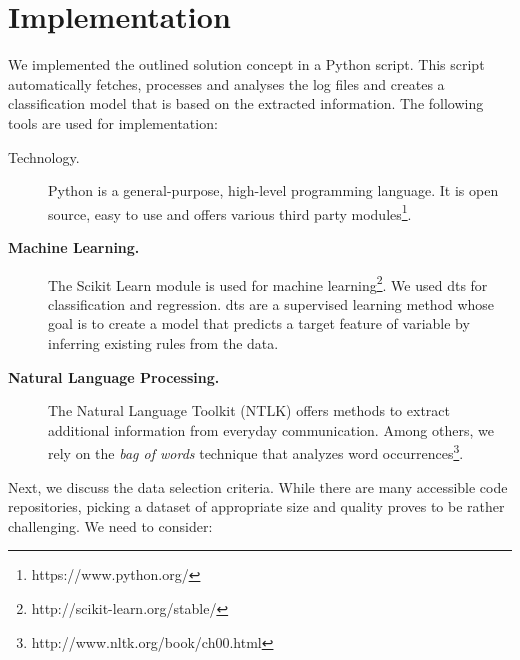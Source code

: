 \section{Implementation}
\label{sec:impl}

We implemented the outlined solution concept in a Python script. This script automatically fetches, processes and analyses the log files and creates a classification model that is based on the extracted information. The following tools are used for implementation:

\begin{description}

\item[Technology.] Python is a general-purpose, high-level programming language. It is open source, easy to use and offers various third party modules\footnote{https://www.python.org/}.

\item[\textbf{Machine Learning.}] The Scikit Learn module is used for machine learning\footnote{http://scikit-learn.org/stable/}. We used \glspl*{dt} for classification and regression. \Glspl*{dt} are a supervised learning method whose goal is to create a model that predicts a target feature of variable by inferring existing rules from the data.

\item[\textbf{Natural Language Processing.}] The Natural Language Toolkit (NTLK) offers methods to extract additional information from everyday communication. Among others, we rely on the \emph{bag of words} technique that analyzes word occurrences\footnote{http://www.nltk.org/book/ch00.html}.

\end{description}

Next, we discuss the data selection criteria. While there are many accessible code repositories, picking a dataset of appropriate size and quality proves to be rather challenging. We need to consider:

